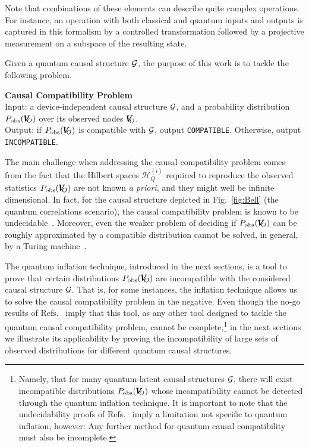 \documentclass[superscriptaddress,aps,prx,nofootinbib,twocolumn,twoside,reprint,letterpaper,longbibliography]{revtex4-2}
\def\H{{\mathcal H}}
\begin{document}
Note that combinations of these elements can describe quite complex operations.
For instance, an operation with both classical and quantum inputs and outputs is captured in this formalism by a controlled transformation followed by a projective measurement on a subspace of the resulting state.

Given a quantum causal structure ${\cal G}$, the purpose of this work is to tackle the following problem.

\vspace{10pt}
\noindent \textbf{Causal Compatibility Problem}\\
Input: a device-independent causal structure ${\cal G}$, and a probability distribution ${P_\text{obs}}({\pmb{V}\hspace{-1ex}}_{O})$ over its observed nodes ${\pmb{V}\hspace{-1ex}}_{O}$.\\
Output: if ${P_\text{obs}}({\pmb{V}\hspace{-1ex}}_{O})$ is compatible with ${\cal G}$, output \texttt{COMPATIBLE}. Otherwise, output \texttt{INCOMPATIBLE}.
\vspace{10pt}

The main challenge when addressing the causal compatibility problem comes from the fact that the Hilbert spaces $\H^{(i)}_Q$ required to reproduce the observed statistics ${P_\text{obs}}({\pmb{V}\hspace{-1ex}}_{O})$ are not known \emph{a priori}, and they might well be infinite dimensional. In fact, for the causal structure depicted in Fig.~\ref{fig:Bell} (the quantum correlations scenario), the causal compatibility problem is known to be undecidable~\cite{Slofstra}. Moreover, even the weaker problem of deciding if ${P_\text{obs}}({\pmb{V}\hspace{-1ex}}_{O})$ can be roughly approximated by a compatible distribution cannot be solved, in general, by a Turing machine~\cite{Ji2020Connes}.

The quantum inflation technique, introduced in the next sections, is a tool to prove that certain distributions ${P_\text{obs}}({\pmb{V}\hspace{-1ex}}_{O})$ are incompatible with the considered causal structure ${\cal G}$. That is, for some instances, the inflation technique allows us to solve the causal compatibility problem in the negative. Even though the no-go results of Refs.~\cite{Slofstra,Ji2020Connes} imply that this tool, as any other tool designed to tackle the quantum causal compatibility problem, cannot be complete,\footnote{Namely, that for many quantum-latent causal structures ${\cal G}$, there will exist incompatible distributions ${P_\text{obs}}({\pmb{V}\hspace{-1ex}}_{O})$ whose incompatibility cannot be detected through the quantum inflation technique. It is important to note that the undecidability proofs of Refs.~\cite{Slofstra,Ji2020Connes} imply a limitation not specific to quantum inflation, however: Any further method for quantum causal compatibility must also be incomplete.} in the next sections we illustrate its applicability by proving the incompatibility of large sets of observed distributions for different quantum causal structures.
\end{document}
